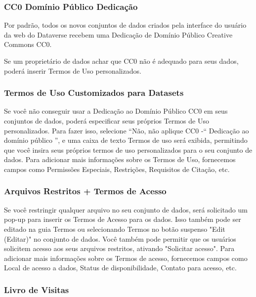 \documentclass[12pt,hidelinks]{article}
\begin{document}
        \subsubsection{CC0 Domínio Público Dedicação}
        
\qquad Por padrão, todos os novos conjuntos de dados criados pela interface do usuário da web do Dataverse recebem uma Dedicação de Domínio Público Creative Commons CC0.

Se um proprietário de dados achar que CC0 não é adequado para seus dados, poderá inserir Termos de Uso personalizados.
    
        \subsubsection{Termos de Uso Customizados para Datasets}
        
\qquad Se você não conseguir usar a Dedicação ao Domínio Público CC0 em seus conjuntos de dados, poderá especificar seus próprios Termos de Uso personalizados. Para fazer isso, selecione “Não, não aplique CC0 -“ Dedicação ao domínio público ”, e uma caixa de texto Termos de uso será exibida, permitindo que você insira seus próprios termos de uso personalizados para o seu conjunto de dados. Para adicionar mais informações sobre os Termos de Uso, fornecemos campos como Permissões Especiais, Restrições, Requisitos de Citação, etc.
        
        \subsubsection{Arquivos Restritos + Termos de Acesso}
        
\qquad Se você restringir qualquer arquivo no seu conjunto de dados, será solicitado um pop-up para inserir os Termos de Acesso para os dados. Isso também pode ser editado na guia Termos ou selecionando Termos no botão suspenso "Edit (Editar)" no conjunto de dados. Você também pode permitir que os usuários solicitem acesso aos seus arquivos restritos, ativando "Solicitar acesso". Para adicionar mais informações sobre os Termos de acesso, fornecemos campos como Local de acesso a dados, Status de disponibilidade, Contato para acesso, etc.
        
        \subsubsection{Livro de Visitas}
        
\end{document}
